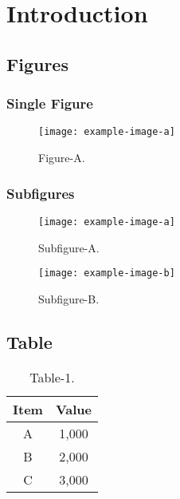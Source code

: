 

\let\clearpage\relax
\chapter{Introduction}

\section{Figures}

\subsection{Single Figure}

\begin{figure}[!htp]
    \centering
    \texttt{[image: example-image-a]}
    \caption{Figure-A.}
    \label{fig:intro}
\end{figure}

\subsection{Subfigures}

\begin{figure}[!htp]
    \begin{minipage}{0.48\textwidth}
        \centering
        \texttt{[image: example-image-a]}
        \caption{Subfigure-A.}
        \label{fig:sub_a}
    \end{minipage}\hfill
    \begin{minipage}{0.48\textwidth}
        \centering
        \texttt{[image: example-image-b]}
        \caption{Subfigure-B.}
        \label{fig:sub_b}
    \end{minipage}
\end{figure}

\section{Table}

\begin{table}[!htp]
    \begin{center}
    \caption{Table-1.}
    \label{tab:tab-1}
        \begin{tabular}{cc}
            \toprule
                Item   &   Value \\
            \midrule
                A      &   1,000 \\
                B      &   2,000 \\
                C      &   3,000 \\
            \bottomrule
        \end{tabular}
    \end{center}
\end{table}

